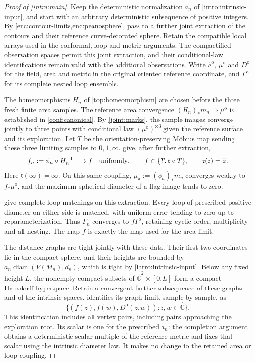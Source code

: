\documentclass[11pt]{article}
\numberwithin{equation}{section}
\theoremstyle{definition}
\theoremstyle{remark}
\newcommand{\Chat}{\widehat{\mathbb C}}
\newcommand{\1}{\mathbf 1}
\DeclareMathOperator{\diam}{diam}
\begin{document}
\begin{proof}[Proof of \cref{intro:main}]
Keep the deterministic normalization $a_n$ of
\cref{intro:intrinsic-input}, and start with an arbitrary deterministic
subsequence of positive integers. By
\cref{enc:contour-limits,enc:peanosphere}, pass to a further joint
extraction of the contours and their reference curve-decorated sphere.
Retain the compatible local arrays used in the conformal, loop and
metric arguments. The compactified observation spaces permit this
joint extraction, and their conditional-law identifications remain
valid with the additional observations. Write $h^{\mathrm o}$,
$\mu^{\mathrm o}$ and $D^{\mathrm o}$ for the field, area and metric
in the original oriented reference coordinate, and
$\Gamma^{\mathrm o}$ for its complete nested loop ensemble.

The homeomorphisms $H_n$ of \cref{top:homeomorphism} are chosen before
the three fresh finite area samples. The reference area convergence
$(H_n)_*m_n\Rightarrow\mu^{\mathrm o}$ is established in
\cref{conf:canonical}. By \cref{joint:marks}, the sample images
converge jointly to three points with conditional law
$(\mu^{\mathrm o})^{\otimes3}$ given the reference surface and its
exploration. Let $T$ be the orientation-preserving
M\"obius map sending these three limiting samples to $0,1,\infty$.
 give, after further extraction,
\[
 f_n:=\phi_n\circ H_n^{-1}\longrightarrow f
 \quad\hbox{uniformly},\qquad
 f\in\{T,\mathfrak r\circ T\},
 \qquad \mathfrak r(z)=\overline z.
\]
Here $\mathfrak r(\infty)=\infty$. On this same coupling,
$\mu_n:=(\phi_n)_*m_n$ converges weakly to $f_*\mu^{\mathrm o}$,
and the maximum spherical diameter of a flag image tends to zero.

 give complete loop matchings on
this extraction. Every loop of prescribed positive diameter on either
side is matched, with uniform error tending to zero up to
reparameterization. Thus $\Gamma_n$ converges to
$f\Gamma^{\mathrm o}$, retaining cyclic order, multiplicity and all
nesting. The map $f$ is exactly the map used for the area limit.

The distance graphs are tight jointly with these data. Their first two
coordinates lie in the compact sphere, and their heights are bounded
by $a_n\diam(V(M_n),d_n)$, which is tight by
\cref{intro:intrinsic-input}. Below any fixed height $L$, the
nonempty compact subsets of $\Chat^2\times[0,L]$ form a compact
Hausdorff hyperspace. Retain a convergent further subsequence of these
graphs and of the intrinsic spaces.  identifies
its graph limit, sample by sample, as
\[
 \{(f(z),f(w),D^{\mathrm o}(z,w)):z,w\in\Chat\}.
\]
This identification includes all vertex pairs, including pairs
approaching the exploration root. Its scalar is one for the prescribed
$a_n$: the completion argument obtains a deterministic scalar multiple
of the reference metric and fixes that scalar using the intrinsic
diameter law. It makes no change to the retained area or loop coupling.


\end{proof}
\end{document}
